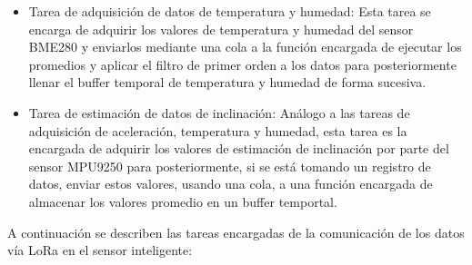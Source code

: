 \begin{itemize}
    \item Tarea de adquisición de datos de temperatura y humedad: Esta tarea se encarga de adquirir los valores de temperatura y humedad del sensor BME280 y enviarlos mediante una cola a la función encargada de ejecutar los promedios y aplicar el filtro de primer orden a los datos para posteriormente llenar el buffer temporal de temperatura y humedad de forma sucesiva.

    \item Tarea de estimación de datos de inclinación: Análogo a las tareas de adquisición de aceleración, temperatura y humedad, esta tarea es la encargada de adquirir los valores de estimación de inclinación por parte del sensor MPU9250 para posteriormente, si se está tomando un registro de datos, enviar estos valores, usando una cola, a una función encargada de almacenar los valores promedio en un buffer temportal.

\end{itemize}

A continuación se describen las tareas encargadas de la comunicación de los datos vía LoRa en el sensor inteligente:



